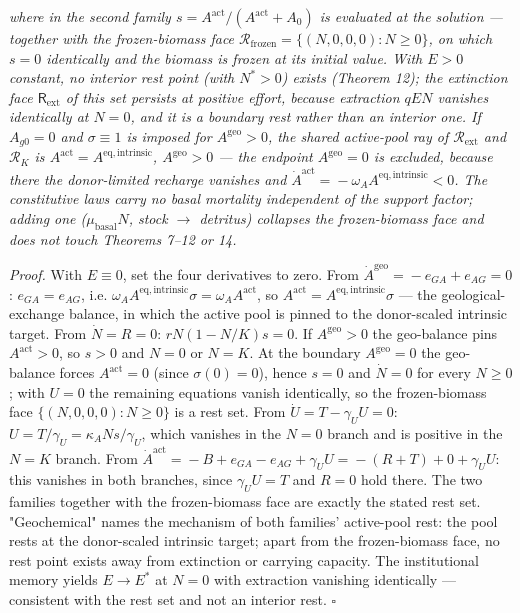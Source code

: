 \documentclass[11pt]{article}
\begin{document}
 \emph{where in the second family \(s =\allowbreak{} A^{\mathrm{act}}/(A^{\mathrm{act}} +\allowbreak{} A_0)\) is evaluated at the solution --- together with the frozen-biomass face \(\mathcal{R}_{\mathrm{frozen}} =\allowbreak{} \{(N,\allowbreak{} 0,\allowbreak{} 0,\allowbreak{} 0) : N \ge 0\}\), on which \(s = 0\) identically and the biomass is frozen at its initial value. With \(E>0\) constant, no interior rest point (with \(N^*>0\)) exists (Theorem 12); the extinction face \(\mathsf R_{\mathrm{ext}}\) of this set persists at positive effort, because extraction \(qEN\) vanishes identically at \(N=0\), and it is a boundary rest rather than an interior one. If \(A_{g0} = 0\) and \(\sigma \equiv 1\) is imposed for \(A^{\mathrm{geo}} > 0\), the shared active-pool ray of \(\mathcal{R}_{\mathrm{ext}}\) and \(\mathcal{R}_K\) is \(A^{\mathrm{act}} =\allowbreak{} A^{\mathrm{eq,\allowbreak{}intrinsic}}\), \(A^{\mathrm{geo}} > 0\) --- the endpoint \(A^{\mathrm{geo}} = 0\) is excluded, because there the donor-limited recharge vanishes and \(\dot A^{\mathrm{act}} =\allowbreak{} -\omega_A A^{\mathrm{eq,\allowbreak{}intrinsic}} < 0\). The constitutive laws carry no basal mortality independent of the support factor; adding one (\(\mu_{\mathrm{basal}} N\), stock \(\to\) detritus) collapses the frozen-biomass face and does not touch Theorems 7--12 or 14.}

\emph{Proof.} With \(E \equiv 0\), set the four derivatives to zero. From \(\dot A^{\mathrm{geo}} =\allowbreak{} -e_{GA} +\allowbreak{} e_{AG} =\allowbreak{} 0\): \(e_{GA} = e_{AG}\), i.e. \(\omega_A A^{\mathrm{eq,\allowbreak{}intrinsic}} \sigma =\allowbreak{} \omega_A A^{\mathrm{act}}\), so \(A^{\mathrm{act}} =\allowbreak{} A^{\mathrm{eq,\allowbreak{}intrinsic}} \sigma\) --- the geological-exchange balance, in which the active pool is pinned to the donor-scaled intrinsic target. From \(\dot N = R = 0\): \(rN(1 - N/\allowbreak{}K)s = 0\). If \(A^{\mathrm{geo}} > 0\) the geo-balance pins \(A^{\mathrm{act}} > 0\), so \(s > 0\) and \(N = 0\) or \(N = K\). At the boundary \(A^{\mathrm{geo}} = 0\) the geo-balance forces \(A^{\mathrm{act}} = 0\) (since \(\sigma(0) = 0\)), hence \(s = 0\) and \(\dot N = 0\) for every \(N \ge 0\); with \(U = 0\) the remaining equations vanish identically, so the frozen-biomass face \(\{(N, 0, 0, 0) : N \ge 0\}\) is a rest set. From \(\dot U = T - \gamma_U U = 0\): \(U =\allowbreak{} T/\gamma_U =\allowbreak{} \kappa_A N s/\gamma_U\), which vanishes in the \(N = 0\) branch and is positive in the \(N = K\) branch. From \(\dot A^{\mathrm{act}} =\allowbreak{} -B +\allowbreak{} e_{GA} - e_{AG} +\allowbreak{} \gamma_U U =\allowbreak{} -(R +\allowbreak{} T) +\allowbreak{} 0 +\allowbreak{} \gamma_U U\): this vanishes in both branches, since \(\gamma_U U = T\) and \(R = 0\) hold there. The two families together with the frozen-biomass face are exactly the stated rest set. "Geochemical" names the mechanism of both families' active-pool rest: the pool rests at the donor-scaled intrinsic target; apart from the frozen-biomass face, no rest point exists away from extinction or carrying capacity. The institutional memory yields \(E \to E^*\) at \(N = 0\) with extraction vanishing identically --- consistent with the rest set and not an interior rest. \(\square\)
\end{document}
